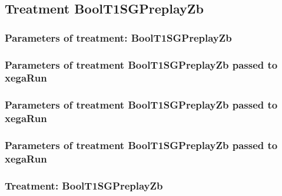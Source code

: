 \documentclass[18pt,c]{beamer}
\makeatletter
\def\beamer@writeslidentry@miniframesoff{%
  \expandafter\beamer@ifempty\expandafter{\beamer@framestartpage}{}%
  {%
   \clearpage\beamer@notesactions%
  }
}
\newcommand*{\miniframesoff}{\let\beamer@writeslidentry=\beamer@writeslidentry@miniframesoff}
\makeatother
\begin{document}
\miniframesoff
\subsection{Treatment BoolT1SGPreplayZb}

 \begin{frame}
 \fontsize{8pt}{9pt}\selectfont
 \frametitle{  Parameters of treatment: BoolT1SGPreplayZb 
 }

 \label{ExpCtParmTable012.tex}  
 \end{frame}


 \begin{frame}
 \fontsize{8pt}{9pt}\selectfont
 \frametitle{  Parameters of treatment BoolT1SGPreplayZb passed to xegaRun
 }

 \label{ExpCtParmTable013.tex}  
 \end{frame}


 \begin{frame}
 \fontsize{8pt}{9pt}\selectfont
 \frametitle{  Parameters of treatment BoolT1SGPreplayZb passed to xegaRun
 }

 \label{ExpCtParmTable014.tex}  
 \end{frame}


 \begin{frame}
 \fontsize{8pt}{9pt}\selectfont
 \frametitle{  Parameters of treatment BoolT1SGPreplayZb passed to xegaRun
 }

 \label{ExpCtParmTable015.tex}  
 \end{frame}

 \begin{frame}
 \fontsize{8pt}{9pt}\selectfont
 \frametitle{ Treatment: BoolT1SGPreplayZb }

 \label{ExpCStatsTable010.tex}  
 \end{frame}
\end{document}
